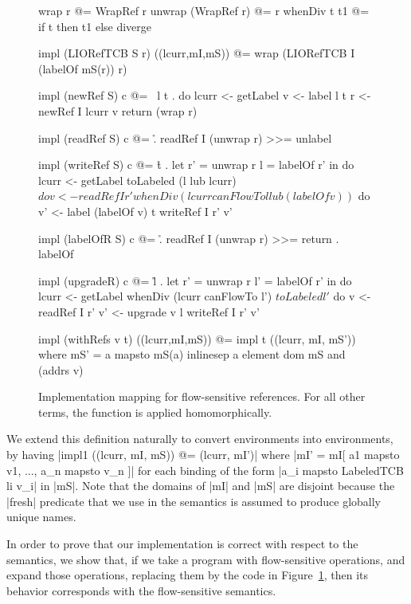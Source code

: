 \begin{figure}
\small
\begin{code}
wrap r @= WrapRef r
unwrap (WrapRef r) @= r
whenDiv t t1 @= if t then t1 else diverge

impl (LIORefTCB S r) ((lcurr,mI,mS)) @= wrap (LIORefTCB I (labelOf mS(r)) r)

impl (newRef S) c @= \ l t . do
  lcurr  <- getLabel
  v      <- label l t
  r      <- newRef I lcurr v
  return (wrap r)


impl (readRef S) c @= \r . readRef I (unwrap r) >>= unlabel


impl (writeRef S) c @= \r t . let  r'  = unwrap r
                                   l   = labelOf r' in do
  lcurr <- getLabel
  toLabeled (l lub lcurr) $ do
     v   <- readRef I r'
     whenDiv (lcurr canFlowTo l lub (labelOf v)) $ do
       v'  <- label (labelOf v) t
       writeRef I r' v'


impl (labelOfR S) c @= \r . readRef I (unwrap r) >>= return . labelOf

impl (upgradeR) c @= \r l . let  r'  = unwrap r
                                 l'  = labelOf r' in do
  lcurr <- getLabel
  whenDiv (lcurr canFlowTo l') $ toLabeled l' $ do
     v   <- readRef I r'
     v'  <- upgrade v l
     writeRef I r' v'

impl (withRefs v t) ((lcurr,mI,mS)) @= impl t ((lcurr, mI, mS'))
   where
    mS'  = {a mapsto mS(a) inlinesep a element dom mS and (addrs v) }

\end{code}
\caption{Implementation mapping for flow-sensitive references. For all other terms, the function is applied homomorphically.\label{fig:fs-exts-semantics-impl}}
\end{figure}

We extend this definition naturally to convert \liofs{} environments
into \lio{} environments, by having |impl1 ((lcurr, mI, mS)) @=
(lcurr, mI')| where |mI' = mI[ a1 mapsto v1, ..., a_n mapsto v_n ]|
for each binding of the form |a_i mapsto LabeledTCB li v_i| in
|mS|. Note that the domains of |mI| and |mS| are disjoint because the
|fresh| predicate that we use in the semantics is assumed to produce
globally unique names.

In order to prove that our implementation is correct with respect to
the semantics, we show that, if we take a program with flow-sensitive
operations, and expand those operations, replacing them by the code in
Figure~\ref{fig:fs-exts-semantics-impl}, then its behavior corresponds
with the flow-sensitive semantics.

